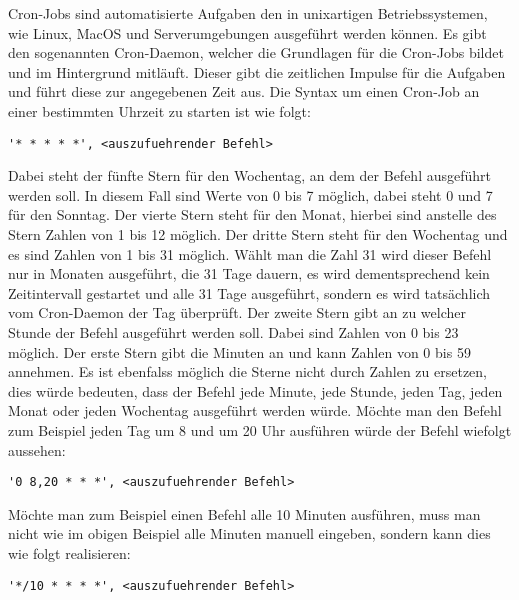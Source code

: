 Cron-Jobs sind automatisierte Aufgaben den in unixartigen Betriebssystemen, wie Linux, MacOS und Serverumgebungen ausgeführt werden können. Es gibt den sogenannten Cron-Daemon, welcher die Grundlagen für die Cron-Jobs bildet und im Hintergrund mitläuft. Dieser gibt die zeitlichen Impulse für die Aufgaben und führt diese zur angegebenen Zeit aus. Die Syntax um einen Cron-Job an einer bestimmten Uhrzeit zu starten ist wie folgt:
\cite{cron_jobs_basics}
\newline
\begin{lstlisting}
'* * * * *', <auszufuehrender Befehl>
\end{lstlisting}
Dabei steht der fünfte Stern für den Wochentag, an dem der Befehl ausgeführt werden soll. In diesem Fall sind Werte von 0 bis 7 möglich, dabei steht 0 und 7 für den Sonntag.
\newline
Der vierte Stern steht für den Monat, hierbei sind anstelle des Stern Zahlen von 1 bis 12 möglich.
\newline
Der dritte Stern steht für den Wochentag und es sind Zahlen von 1 bis 31 möglich. Wählt man die Zahl 31 wird dieser Befehl nur in Monaten ausgeführt, die 31 Tage dauern, es wird dementsprechend kein Zeitintervall gestartet und alle 31 Tage ausgeführt, sondern es wird tatsächlich vom Cron-Daemon der Tag überprüft.
\newline
Der zweite Stern gibt an zu welcher Stunde der Befehl ausgeführt werden soll. Dabei sind Zahlen von 0 bis 23 möglich.
\newline
Der erste Stern gibt die Minuten an und kann Zahlen von 0 bis 59 annehmen.
\newline
Es ist ebenfalss möglich die Sterne nicht durch Zahlen zu ersetzen, dies würde bedeuten, dass der Befehl jede Minute, jede Stunde, jeden Tag, jeden Monat oder jeden Wochentag ausgeführt werden würde. Möchte man den Befehl zum Beispiel jeden Tag um 8 und um 20 Uhr ausführen würde der Befehl wiefolgt aussehen:
\newline
\begin{lstlisting}
'0 8,20 * * *', <auszufuehrender Befehl>
\end{lstlisting}
Möchte man zum Beispiel einen Befehl alle 10 Minuten ausführen, muss man nicht wie im obigen Beispiel alle Minuten manuell eingeben, sondern kann dies wie folgt realisieren:
\newline
\begin{lstlisting}
'*/10 * * * *', <auszufuehrender Befehl>
\end{lstlisting}
\cite{cron_jobs_scheduling_examples}